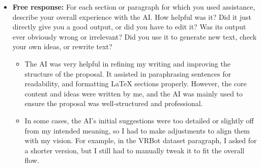 \documentclass[11pt,a4paper]{article}
\begin{document}
\begin{itemize}
    \item \textbf{Free response:} For each section or paragraph for which you used assistance, describe your overall experience with the AI. How helpful was it? Did it just directly give you a good output, or did you have to edit it? Was its output ever obviously wrong or irrelevant? Did you use it to generate new text, check your own ideas, or rewrite text?
    \begin{itemize}
        \item The AI was very helpful in refining my writing and improving the structure of the proposal. It assisted in paraphrasing sentences for readability, and formatting LaTeX sections properly. However, the core content and ideas were written by me, and the AI was mainly used to ensure the proposal was well-structured and professional.  
        \item In some cases, the AI’s initial suggestions were too detailed or slightly off from my intended meaning, so I had to make adjustments to align them with my vision. For example, in the VRBot dataset paragraph, I asked for a shorter version, but I still had to manually tweak it to fit the overall flow.  
    \end{itemize}
\end{itemize}




\footnotesize

\end{document}
